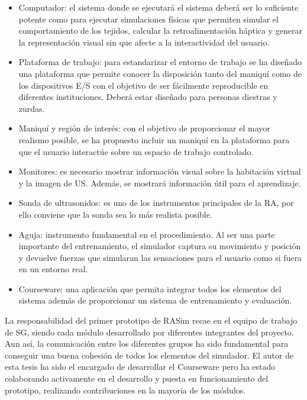 \begin{itemize}
    \item Computador: el sistema donde se ejecutará el sistema deberá ser lo suficiente potente como para ejecutar simulaciones físicas que permiten simular el comportamiento de los tejidos, calcular la retroalimentación háptica y generar la representación visual sin que afecte a la interactividad del usuario.
    \item Plataforma de trabajo: para estandarizar el entorno de trabajo se ha diseñado una plataforma que permite conocer la disposición tanto del maniquí como de los dispositivos \ac{E/S} con el objetivo de ser fácilmente reproducible en diferentes instituciones. Deberá estar diseñado para personas diestras y zurdas.
    \item Maniquí y región de interés: con el objetivo de proporcionar el mayor realismo posible, se ha propuesto incluir un maniquí en la plataforma para que el usuario interactúe sobre un espacio de trabajo controlado.
    \item Monitores: es necesario mostrar información visual sobre la habitación virtual y la imagen de \ac{US}. Además, se mostrará información útil para el aprendizaje.
    \item Sonda de ultrasonidos: es uno de los instrumentos principales de la \ac{RA}, por ello conviene que la sonda sea lo más realista posible.
    \item Aguja: instrumento fundamental en el procedimiento. Al ser una parte importante del entrenamiento, el simulador captura su movimiento y posición y devuelve fuerzas que simularan las sensaciones para el usuario como si fuera en un entorno real.
    \item \ac{Courseware}: una aplicación que permita integrar todos los elementos del sistema además de proporcionar un sistema de entrenamiento y evaluación.
\end{itemize}

La responsabilidad del primer prototipo de \ac{RASim} recae en el equipo de trabajo de \ac{SG}, siendo cada módulo desarrollado por diferentes integrantes del proyecto. Aun así, la comunicación entre los diferentes grupos ha sido fundamental para conseguir una buena cohesión de todos los elementos del simulador. El autor de esta tesis ha sido el encargado de desarrollar el \ac{Courseware} pero ha estado colaborando activamente en el desarrollo y puesta en funcionamiento del prototipo, realizando contribuciones en la mayoría de los módulos.


